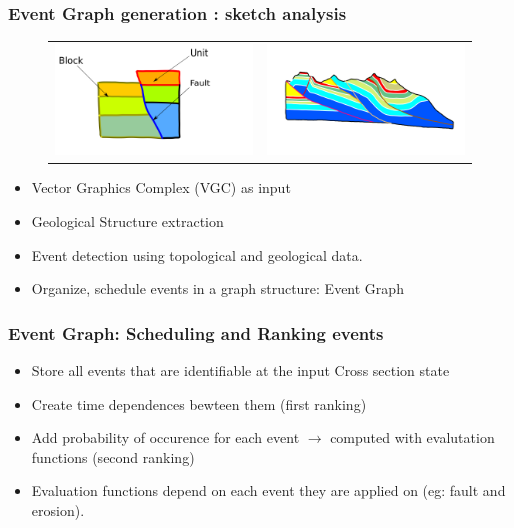 \documentclass{beamer}
\begin{document}
	\begin{frame}
	\frametitle{Event Graph generation : sketch analysis}
	\begin{figure}[H]
	\centering
	\vspace*{-1cm}
	\begin{tabular}{@{}cc@{}}
	\includegraphics[width=.49\textwidth]{geologyStructEdit.png}&
	\includegraphics[width=.58\textwidth]{chartreusevpaint.png}\\
	\end{tabular}
	\label{unfaulteg}
	\end{figure}
	\vspace*{-1cm}
	\begin{itemize}
	\item Vector Graphics Complex (VGC) as input
	\item Geological Structure extraction
	\item Event detection using topological and geological data.
	\item Organize, schedule events in a graph structure: Event Graph
	\end{itemize}
	\end{frame}			
	
	\begin{frame}
	\frametitle{Event Graph: Scheduling and Ranking events}
	\begin{itemize}
	\item Store all events that are identifiable at the input Cross section state
	\item Create time dependences bewteen them (first ranking)
	\item Add probability of occurence for each event $\longrightarrow$ computed with evalutation functions (second ranking)
	\item Evaluation functions depend on each event they are applied on (eg: fault and erosion).
	\end{itemize}
	\end{frame}
	
\end{document}
